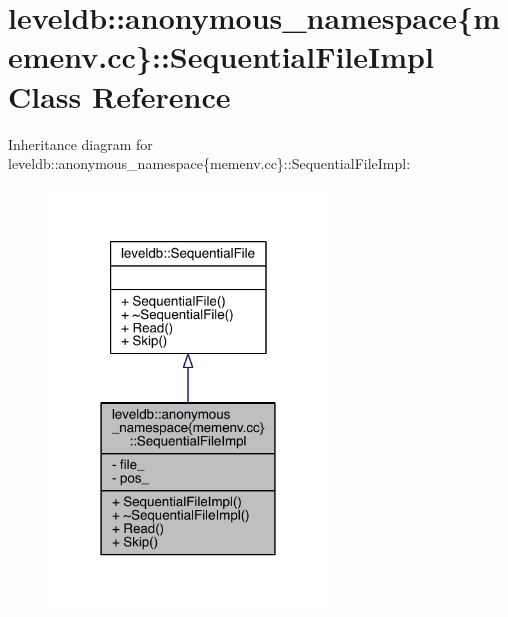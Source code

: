 \hypertarget{classleveldb_1_1anonymous__namespace_02memenv_8cc_03_1_1_sequential_file_impl}{}\section{leveldb\+:\+:anonymous\+\_\+namespace\{memenv.\+cc\}\+:\+:Sequential\+File\+Impl Class Reference}
\label{classleveldb_1_1anonymous__namespace_02memenv_8cc_03_1_1_sequential_file_impl}


Inheritance diagram for leveldb\+:\+:anonymous\+\_\+namespace\{memenv.\+cc\}\+:\+:Sequential\+File\+Impl\+:
\nopagebreak
\begin{figure}[H]
\begin{center}
\leavevmode
\includegraphics[width=210pt]{classleveldb_1_1anonymous__namespace_02memenv_8cc_03_1_1_sequential_file_impl__inherit__graph}
\end{center}
\end{figure}



